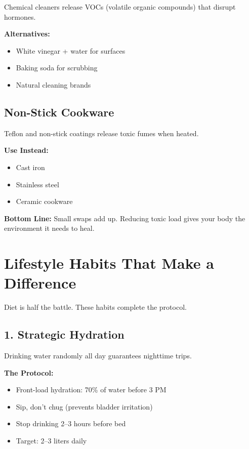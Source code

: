 \documentclass[11pt,oneside,openany]{book}
\begin{document}
Chemical cleaners release VOCs (volatile organic compounds) that disrupt hormones.

\textbf{Alternatives:}
\begin{itemize}[leftmargin=*]
\item White vinegar + water for surfaces
\item Baking soda for scrubbing
\item Natural cleaning brands
\end{itemize}

\section*{Non-Stick Cookware}

Teflon and non-stick coatings release toxic fumes when heated.

\textbf{Use Instead:}
\begin{itemize}[leftmargin=*]
\item Cast iron
\item Stainless steel
\item Ceramic cookware
\end{itemize}

\textbf{Bottom Line:} Small swaps add up. Reducing toxic load gives your body the environment it needs to heal.


\chapter*{Lifestyle Habits That Make a Difference}

Diet is half the battle. These habits complete the protocol.

\section*{1. Strategic Hydration}
Drinking water randomly all day guarantees nighttime trips.

\textbf{The Protocol:}
\begin{itemize}[leftmargin=*]
\item Front-load hydration: 70\% of water before 3 PM
\item Sip, don't chug (prevents bladder irritation)
\item Stop drinking 2--3 hours before bed
\item Target: 2--3 liters daily
\end{itemize}
\end{document}
